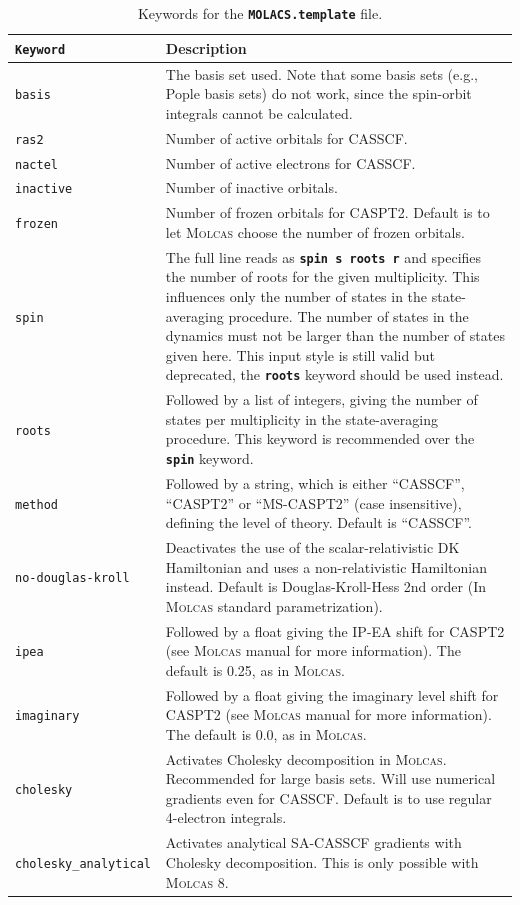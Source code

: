 \documentclass[a4paper,11pt,DIV=15,openany,twoside=false]{scrbook}
\newcommand{\ttt}[1]{\textbf{\texttt{#1}}}
\begin{document}
\begin{table}
  \centering
  \caption{Keywords for the \ttt{MOLACS.template} file.}
  \label{tab:molcas_temp}
  \begin{tabular}{>{\tt}lp{12cm}}
  \toprule
  Keyword       &Description\\
  \midrule
basis           &The basis set used. Note that some basis sets (e.g., Pople basis sets) do not work, since the spin-orbit integrals cannot be calculated.\\
ras2            &Number of active orbitals for CASSCF.\\
nactel          &Number of active electrons for CASSCF.\\
inactive        &Number of inactive orbitals.\\
frozen          &Number of frozen orbitals for CASPT2. Default is to let \textsc{Molcas} choose the number of frozen orbitals.\\
spin            &The full line reads as \ttt{spin s roots r} and specifies the number of roots for the given multiplicity. This influences only the number of states in the state-averaging procedure. The number of states in the dynamics must not be larger than the number of states given here. This input style is still valid but deprecated, the \ttt{roots} keyword should be used instead.\\
roots           &Followed by a list of integers, giving the number of states per multiplicity in the state-averaging procedure. This keyword is recommended over the \ttt{spin} keyword.\\
method          &Followed by a string, which is either ``CASSCF'', ``CASPT2'' or ``MS-CASPT2'' (case insensitive), defining the level of theory. Default is ``CASSCF''.\\
no-douglas-kroll&Deactivates the use of the scalar-relativistic DK Hamiltonian and uses a non-relativistic Hamiltonian instead. Default is Douglas-Kroll-Hess 2nd order  (In \textsc{Molcas} standard parametrization).\\
ipea            &Followed by a float giving the IP-EA shift for CASPT2 (see \textsc{Molcas} manual for more information). The default is 0.25, as in \textsc{Molcas}.\\
imaginary       &Followed by a float giving the imaginary level shift for CASPT2 (see \textsc{Molcas} manual for more information). The default is 0.0, as in \textsc{Molcas}.\\
cholesky        &Activates Cholesky decomposition in \textsc{Molcas}. Recommended for large basis sets. Will use numerical gradients even for CASSCF. Default is to use regular 4-electron integrals.\\
cholesky\_analytical    &Activates analytical SA-CASSCF gradients with Cholesky decomposition. This is only possible with \textsc{Molcas} 8.\\
  \bottomrule
  \end{tabular}
\end{table}
\end{document}
